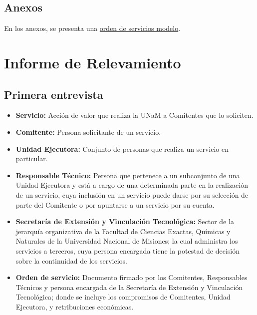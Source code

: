 \subsection{Anexos}
\normalsize{ \indent
En los anexos, se presenta una
\hyperlink{anexoOrdenServicio}{orden de servicios modelo}.
}
\section[Informe]{Informe de Relevamiento}
\subsection{Primera entrevista}
\begin{itemize}
	\item \textbf{Servicio:} Acci\'on de valor que realiza
	la UNaM a Comitentes que lo soliciten.
	\item \textbf{Comitente:} Persona solicitante de un
	servicio.
	\item \textbf{Unidad Ejecutora:} Conjunto de personas
	que realiza un servicio en particular.
	\item \textbf{Responsable T\'ecnico:} Persona que
	pertenece a un subconjunto de una Unidad Ejecutora
	y est\'a a cargo de una determinada parte en la
	realizaci\'on de un servicio, cuya inclusi\'on en
	un servicio puede darse por su selecci\'on de
	parte del Comitente o por apuntarse a un servicio
	por su cuenta.
	\item \textbf{Secretar\'ia de Extensi\'on y
	Vinculaci\'on Tecnol\'ogica:} Sector de la jerarqu\'ia
	organizativa de la Facultad de Ciencias Exactas,
	Qu\'imicas y Naturales de la Universidad Nacional de
	Misiones; la cual administra los servicios a
	terceros, cuya persona encargada tiene la potestad
	de decisi\'on sobre la continuidad de los servicios.
	\item \textbf{Orden de servicio:} Documento firmado
	por los Comitentes, Responsables T\'ecnicos y
	persona encargada de la Secretar\'ia de Extensi\'on
	y Vinculaci\'on Tecnol\'ogica; donde se incluye
	los compromisos de Comitentes, Unidad Ejecutora, y
	retribuciones econ\'omicas.
\end{itemize}
